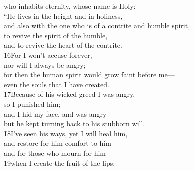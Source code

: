 \begin{poetry}
\poemll    who inhabits eternity, whose name is Holy: \\
\poeml ``He lives in the height and in holiness, \\
\poemll    and also with the one who is of a contrite and humble spirit, \\
\poeml to revive the spirit of the humble, \\
\poemll    and to revive the heart of the contrite. \\
\poeml \v{16}For I won't accuse forever, \\
\poemll    nor will I always be angry; \\
\poeml for then the human spirit would grow faint before me--- \\
\poemll    even the souls that I have created. \\
\poeml \v{17}Because of his wicked greed I was angry, \\
\poemll    so I punished him; \\
\poeml and I hid my face, and was angry--- \\
\poemll    but he kept turning back to his stubborn will. \\
\poeml \v{18}I've seen his ways, yet I will heal him, \\
\poemll    and restore for him comfort to him \\
\poemlll       and for those who mourn for him \\
\poeml \v{19}when I create the fruit of the lips: \\

\end{poetry}
